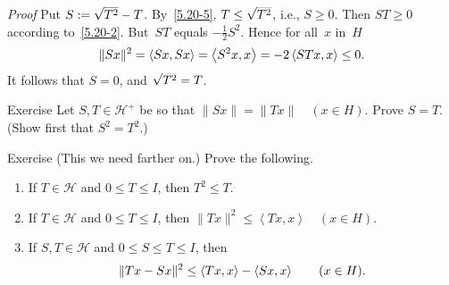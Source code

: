 \documentclass[main.tex]{subfiles}
\begin{document}
\begin{psec}{5.20}
\begin{enumerate}
\noindent \emph{Proof} Put $S:=\smash{\sqrt{T^2}}-T$.
By~\ref{5.20-5}, $T\leq \smash{\sqrt{T^2}}$,
i.e., $S\geq 0$.
Then $ST\geq 0$ according to~\ref{5.20-2}.
But~$ST$ equals $-\frac{1}{2} S^2$.
Hence for all~$x$ in~$H$
\begin{equation*}
\|Sx\|^2 = \left<Sx,Sx\right>=\left<S^2 x,x\right>
=-2\left<STx,x\right>\leq 0\text{.}
\end{equation*}
It follows that $S=0$, and $\smash{\sqrt{T^2}}=T$. \xqed
\end{enumerate}
\end{psec}
%
%
\begin{psec}{5.21}{Exercise}
Let $S,T\in{\mathscr H}^+$ be so that $\|Sx\|=\|Tx\|\quad(x\in H)$.
Prove $S=T$.
(Show first that $S^2 = T^2$.)
\end{psec}
%
%
\begin{psec}{5.22}{Exercise}
(This we need farther on.)
Prove the following.
\begin{enumerate}
\item\label{5.22-1}
If $T\in\mathscr H$ and $0\leq T\leq I$, then $T^2\leq T$.
%
\item\label{5.22-2}
If $T\in\mathscr H$ and $0\leq T\leq I$,
then $\|Tx\|^2\leq \left< Tx,x\right>\quad (x\in H)$.
%
\item\label{5.22-3}
If $S,T\in\mathscr H$ and $0\leq S\leq T\leq I$,
then 
\begin{equation*}
\|Tx-Sx\|^2 \leq \left<Tx,x\right>-\left<Sx,x\right>\qquad (x\in H)\text{.}
\end{equation*}
\end{enumerate}
\end{psec}
\end{document}
